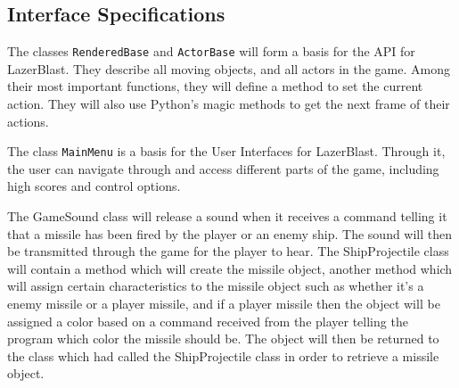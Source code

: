 %
\subsection*{Interface Specifications}
    The classes \texttt{RenderedBase} and
    \texttt{ActorBase} will form a basis for
    the API for LazerBlast.  They describe all moving
    objects, and all actors in the game.  Among their
    most important functions, they will define a method
    to set the current action.  They will also use Python's
    magic methods to get the next frame of their actions.

    The class \texttt{MainMenu} is a basis for the User
    Interfaces for LazerBlast. Through it, the user can navigate
    through and access different parts of the game, including high
    scores and control options.

    The GameSound class will release a sound when it receives
    a command telling it that a missile has been fired by
    the player or an enemy ship.  The sound will then be transmitted
    through the game for the player to hear.  The ShipProjectile
    class will contain a method which will create the missile
    object, another method which will assign certain characteristics
    to the missile object such as whether it’s a enemy missile or a
    player missile, and if a player missile then the object will be
    assigned a color based on a command received from the player
    telling the program which color the missile should be. The
    object will then be returned to the class which had called the
    ShipProjectile class in order to retrieve a missile object.

